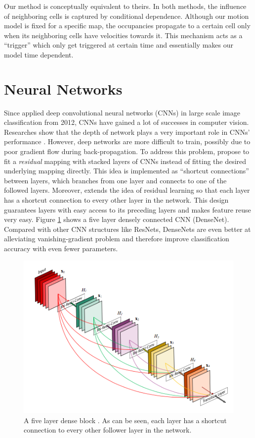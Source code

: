Our method is conceptually equivalent to theirs. In both methods, the influence of neighboring cells is captured by conditional dependence. Although our motion model is fixed for a specific map, the occupancies propagate to a certain cell only when its neighboring cells have velocities towards it. This mechanism acts as a ``trigger'' which only get triggered at certain time and essentially makes our model time dependent.


\section{Neural Networks} \label{lr:network}

Since \citet{krizhevsky2012imagenet} applied deep convolutional neural networks (CNNs) in large scale image classification from 2012, CNNs have gained a lot of successes in computer vision. Researches show that the depth of network plays a very important role in CNNs' performance \citep{simonyan2014very}. However, deep networks are more difficult to train, possibly due to poor gradient flow during back-propagation. To address this problem, \citet{he2016deep} propose to fit a \textit{residual} mapping with stacked layers of CNNs instead of fitting the desired underlying mapping directly. This idea is implemented as ``shortcut connections'' between layers, which branches from one layer and connects to one of the followed layers. Moreover, \citet{huang2016densely} extends the idea of residual learning so that each layer has a shortcut connection to every other layer in the network. This design guarantees layers with easy access to its preceding layers and makes feature reuse very easy. Figure \ref{fig:dense_net} shows a five layer densely connected CNN (DenseNet).  Compared with other CNN structures like ResNets, DenseNets are even better at alleviating vanishing-gradient problem and therefore improve classification accuracy with even fewer parameters. 

\begin{figure}[H]
  \centering
    \includegraphics[width=.6\textwidth]{figures/denseNet.png}
    \caption[A five layer dense block.]{A five layer dense block \citet{huang2016densely}. As can be seen, each layer has a shortcut connection to every other follower layer in the network.}
    \label{fig:dense_net}
\end{figure} 

